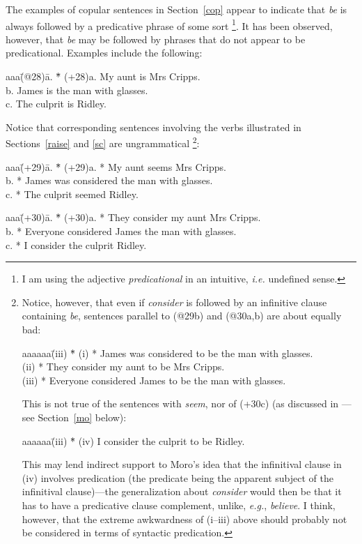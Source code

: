 \label{nonpred}
The examples of copular sentences in Section~\ref{cop} appear to
indicate that {\em be} is always followed by a predicative phrase of
some sort
%
\footnote{I am using the adjective {\em predicational\/} in an
intuitive, {\em i.e.\/} undefined sense.}.  
% 
It has been observed, however, that {\em be} may be followed by phrases
that do not appear to be predicational.  Examples include the following:
\begin{tabbing}
aaa\=(@28)\=a. \= *\= \kill
   \>(+28)\>a. \>  \> My aunt is Mrs Cripps.      \\
   \>     \>b. \>  \> James is the man with glasses. \\
   \>     \>c. \>  \> The culprit is Ridley.
\end{tabbing}

Notice that corresponding sentences involving the verbs illustrated in
Sections~\ref{raise} and \ref{sc} are ungrammatical%
%
\footnote{Notice, however, that even if {\em consider} is followed by an
infinitive clause containing {\em be\/}, sentences parallel to (@29b)
and (@30a,b) are about equally bad:
\begin{tabbing}
aaaaaa\=(iii) \= *\= \kill
      \>(i)   \> *\> James was considered to be the man with glasses. \\
      \>(ii)  \> *\> They consider my aunt to be Mrs Cripps. \\
      \>(iii) \> *\> Everyone considered James to be the man with glasses. 
\end{tabbing}
This is not true of the sentences with {\em seem\/}, nor of (+30c) (as
discussed in \cite{mor90}---see Section~\ref{mo} below):
\begin{tabbing}
aaaaaa\=(iii) \= *\= \kill
      \>(iv)   \>  \> I consider the culprit to be Ridley.
\end{tabbing}
This may lend indirect support to Moro's idea that the infinitival clause
in (iv) involves predication (the predicate being the apparent subject of
the infinitival clause)---the generalization about {\em consider\/}
would then be that it has to have a predicative clause complement,
unlike, {\em e.g.\/}, {\em believe\/}. I think, however, that the
extreme awkwardness of (i--iii) above should probably not be considered
in terms of syntactic predication.}:
%
\begin{tabbing}
aaa\=(+29)\=a. \= *\= \kill
   \>(+29)\>a. \> *\> My aunt seems Mrs Cripps.      \\
   \>     \>b. \> *\> James was considered the man with glasses. \\
   \>     \>c. \> *\> The culprit seemed Ridley. 
\end{tabbing}
\begin{tabbing}
aaa\=(+30)\=a. \= *\= \kill
   \>(+30)\>a. \> *\> They consider my aunt Mrs Cripps.      \\
   \>     \>b. \> *\> Everyone considered James the man with glasses. \\
   \>     \>c. \> *\> I consider the culprit Ridley. 
\end{tabbing}


